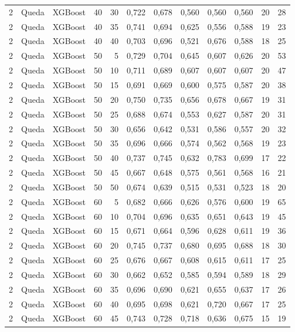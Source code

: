 \begin{longtable}{@{}rllrrrrrrrrr@{}}
2 & Queda & XGBoost & 40 & 30 & 0,722 & 0,678 & 0,560 & 0,560 & 0,560 & 20 & 28 \\
2 & Queda & XGBoost & 40 & 35 & 0,741 & 0,694 & 0,625 & 0,556 & 0,588 & 19 & 23 \\
2 & Queda & XGBoost & 40 & 40 & 0,703 & 0,696 & 0,521 & 0,676 & 0,588 & 18 & 25 \\
2 & Queda & XGBoost & 50 & 5 & 0,729 & 0,704 & 0,645 & 0,607 & 0,626 & 20 & 53 \\
2 & Queda & XGBoost & 50 & 10 & 0,711 & 0,689 & 0,607 & 0,607 & 0,607 & 20 & 47 \\
2 & Queda & XGBoost & 50 & 15 & 0,691 & 0,669 & 0,600 & 0,575 & 0,587 & 20 & 38 \\
2 & Queda & XGBoost & 50 & 20 & 0,750 & 0,735 & 0,656 & 0,678 & 0,667 & 19 & 31 \\
2 & Queda & XGBoost & 50 & 25 & 0,688 & 0,674 & 0,553 & 0,627 & 0,587 & 20 & 31 \\
2 & Queda & XGBoost & 50 & 30 & 0,656 & 0,642 & 0,531 & 0,586 & 0,557 & 20 & 32 \\
2 & Queda & XGBoost & 50 & 35 & 0,696 & 0,666 & 0,574 & 0,562 & 0,568 & 19 & 23 \\
2 & Queda & XGBoost & 50 & 40 & 0,737 & 0,745 & 0,632 & 0,783 & 0,699 & 17 & 22 \\
2 & Queda & XGBoost & 50 & 45 & 0,667 & 0,648 & 0,575 & 0,561 & 0,568 & 16 & 21 \\
2 & Queda & XGBoost & 50 & 50 & 0,674 & 0,639 & 0,515 & 0,531 & 0,523 & 18 & 20 \\
2 & Queda & XGBoost & 60 & 5 & 0,682 & 0,666 & 0,626 & 0,576 & 0,600 & 19 & 65 \\
2 & Queda & XGBoost & 60 & 10 & 0,704 & 0,696 & 0,635 & 0,651 & 0,643 & 19 & 45 \\
2 & Queda & XGBoost & 60 & 15 & 0,671 & 0,664 & 0,596 & 0,628 & 0,611 & 19 & 36 \\
2 & Queda & XGBoost & 60 & 20 & 0,745 & 0,737 & 0,680 & 0,695 & 0,688 & 18 & 30 \\
2 & Queda & XGBoost & 60 & 25 & 0,676 & 0,667 & 0,608 & 0,615 & 0,611 & 17 & 25 \\
2 & Queda & XGBoost & 60 & 30 & 0,662 & 0,652 & 0,585 & 0,594 & 0,589 & 18 & 29 \\
2 & Queda & XGBoost & 60 & 35 & 0,696 & 0,690 & 0,621 & 0,655 & 0,637 & 17 & 26 \\
2 & Queda & XGBoost & 60 & 40 & 0,695 & 0,698 & 0,621 & 0,720 & 0,667 & 17 & 25 \\
2 & Queda & XGBoost & 60 & 45 & 0,743 & 0,728 & 0,718 & 0,636 & 0,675 & 15 & 19 \\

\end{longtable}
